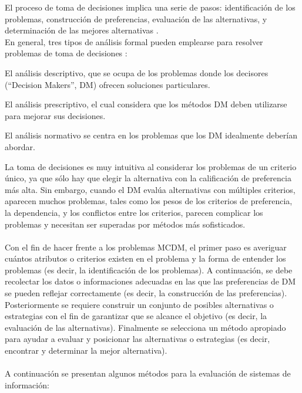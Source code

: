 El proceso de toma de decisiones implica una serie de pasos: identificación de los problemas, construcción de preferencias, evaluación de las alternativas, y determinación de las mejores alternativas \cite[]{simon1977causal, kleindorfer1993decision}.\\
En general, tres tipos de análisis formal pueden emplearse para resolver problemas de toma de decisiones \cite[]{bell1988descriptive, kleindorfer1993decision}:
\\
\begin{viñetas}
\item El análisis descriptivo, que se ocupa de los problemas donde los decisores (``Decision Makers'', DM) ofrecen soluciones particulares.
\item El análisis prescriptivo, el cual considera que los métodos DM deben utilizarse para mejorar sus decisiones.
\item El análisis normativo se centra en los problemas que los DM idealmente deberían abordar.
\\
\end{viñetas}
La toma de decisiones es muy intuitiva al considerar los problemas de un criterio único, ya que sólo hay que elegir la alternativa con la calificación de preferencia más alta. Sin embargo, cuando el DM evalúa alternativas con múltiples criterios, aparecen muchos problemas, tales como los pesos de los criterios de preferencia, la dependencia, y los conflictos entre los criterios, parecen complicar los problemas y necesitan ser superadas por métodos más sofisticados.\\
\\
Con el fin de hacer frente a los problemas MCDM, el primer paso es averiguar cuántos atributos o criterios existen en el problema y la forma de entender los problemas (es decir, la identificación de los problemas). A continuación, se debe recolectar los datos o informaciones adecuadas en las que las preferencias de DM se pueden reflejar correctamente (es decir, la construcción de las preferencias).  Posteriormente se requiere construir un conjunto de posibles alternativas o estrategias con el fin de garantizar que se alcance el objetivo (es decir, la evaluación de las alternativas). Finalmente se selecciona un método apropiado para ayudar a evaluar y posicionar las alternativas o estrategias (es decir, encontrar y determinar la mejor alternativa).\\
\\
A continuación se presentan algunos métodos para la evaluación de sistemas de información: 

